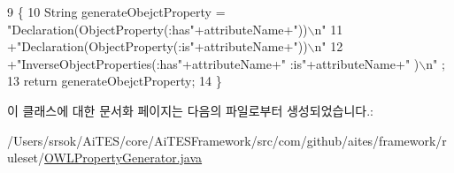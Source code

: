 \begin{DoxyCode}
9                                                               \{
10         String generateObejctProperty = \textcolor{stringliteral}{"Declaration(ObjectProperty(:has"}+attributeName+\textcolor{stringliteral}{"))\(\backslash\)n"}
11                                        +\textcolor{stringliteral}{"Declaration(ObjectProperty(:is"}+attributeName+\textcolor{stringliteral}{"))\(\backslash\)n"}
12                                        +\textcolor{stringliteral}{"InverseObjectProperties(:has"}+attributeName+\textcolor{stringliteral}{" :is"}+attributeName+\textcolor{stringliteral}{"
      )\(\backslash\)n"} ;
13         \textcolor{keywordflow}{return} generateObejctProperty;
14     \}
\end{DoxyCode}


이 클래스에 대한 문서화 페이지는 다음의 파일로부터 생성되었습니다.\+:\begin{DoxyCompactItemize}
\item 
/\+Users/srsok/\+Ai\+T\+E\+S/core/\+Ai\+T\+E\+S\+Framework/src/com/github/aites/framework/ruleset/\mbox{\hyperlink{_o_w_l_property_generator_8java}{O\+W\+L\+Property\+Generator.\+java}}\end{DoxyCompactItemize}
